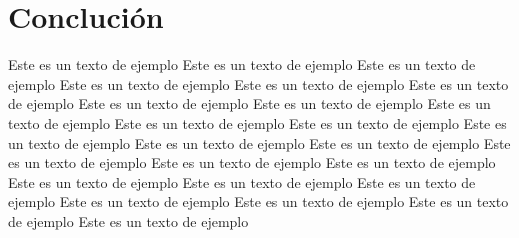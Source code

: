 \documentclass[a4paper, 12pt]{article}
\begin{document}
    \section{\textcolor{rojoPortada}{Conclución}}
    Este es un texto de ejemplo Este es un texto de ejemplo Este es un texto de ejemplo Este es un texto de ejemplo Este es un texto de ejemplo Este es un texto de ejemplo Este es un texto de ejemplo Este es un texto de ejemplo Este es un texto de ejemplo Este es un texto de ejemplo Este es un texto de ejemplo Este es un texto de ejemplo Este es un texto de ejemplo Este es un texto de ejemplo Este es un texto de ejemplo Este es un texto de ejemplo Este es un texto de ejemplo Este es un texto de ejemplo Este es un texto de ejemplo Este es un texto de ejemplo Este es un texto de ejemplo Este es un texto de ejemplo Este es un texto de ejemplo Este es un texto de ejemplo 
    \clearpage
\end{document}
